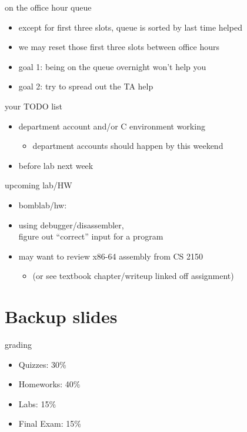 \begin{frame}{on the office hour queue}
    \begin{itemize}
    \item except for first three slots, queue is sorted by last time helped
    \item we may reset those first three slots between office hours
    \vspace{.5cm}
    \item goal 1: being on the queue overnight won't help you
    \item goal 2: try to spread out the TA help
    \end{itemize}
\end{frame}

\begin{frame}{your TODO list}
    \begin{itemize}
    \item department account and/or C environment working
        \begin{itemize}
        \item department accounts should happen by this weekend
        \end{itemize}
    \item before lab next week
    \end{itemize}
\end{frame}

\begin{frame}{upcoming lab/HW}
    \begin{itemize}
    \item bomblab/hw:
    \item using debugger/disassembler, \\ figure out ``correct'' input for a program
    \item may want to review x86-64 assembly from CS 2150
        \begin{itemize}
        \item (or see textbook chapter/writeup linked off assignment)
        \end{itemize}
    \end{itemize}
\end{frame}

\section{Backup slides}

\begin{frame}{grading}
    \begin{itemize}
    \item Quizzes: 30\%
    \item Homeworks: 40\%
    \item Labs: 15\%
    \item Final Exam: 15\%
    \end{itemize}
\end{frame}

\begin{frame}
\end{frame}
